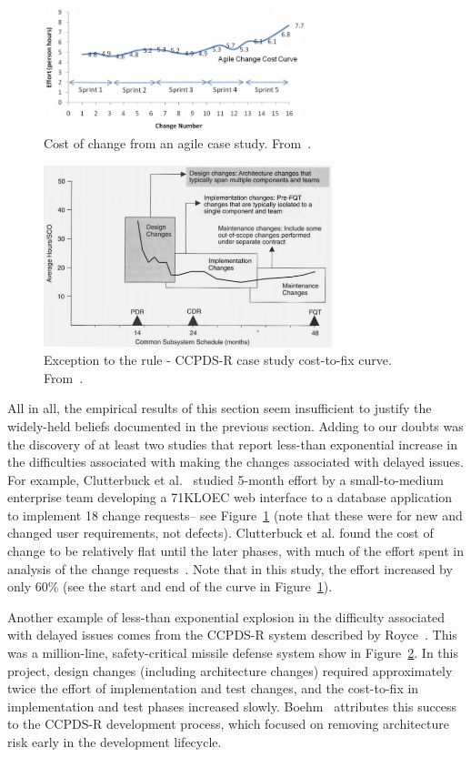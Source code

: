 \begin{figure}
 \includegraphics[width=3in]{img/clutterbuck.png} 
 \caption{Cost of change from an agile case study. From~\cite{Clutterbuck09}.}\label{fig:clutterbuck}
 \end{figure}

\begin{figure}
 \includegraphics[width=3.3in]{img/Royce98.png}
 \caption{Exception to the rule - CCPDS-R case study cost-to-fix curve. From~\cite{Royce98}.}\label{fig:royce}
 \end{figure}
 
 
 All in all, the empirical results of this section seem insufficient to justify
 the widely-held beliefs documented in the previous section. Adding to our doubts
 was the discovery of at least two studies that report less-than exponential
 increase in the difficulties associated with making the changes associated with delayed
 issues. For example,
Clutterbuck et al.~\cite{Clutterbuck09} studied 5-month effort by a small-to-medium enterprise team developing a 71KLOEC web interface to a database application to implement 18 change requests-- see Figure~\ref{fig:clutterbuck} (note that these were for new and changed user requirements, not defects). Clutterbuck et al. found the cost of change to be relatively flat until the later phases, with much of the effort spent in analysis of the change requests~\cite{Clutterbuck09}. Note that in this study, the effort increased by only 60\% (see the start and end of the curve in Figure~\ref{fig:clutterbuck}).

Another example of less-than exponential explosion in the difficulty associated with delayed issues comes from the  CCPDS-R
system described by Royce~\cite{Royce98}. This was a million-line, safety-critical missile defense system show in Figure~\ref{fig:royce}. In this project, design changes (including architecture changes) required approximately twice the effort of implementation and test changes, and the cost-to-fix in implementation and test phases increased slowly. Boehm~\cite{Boehm10} attributes this success to the CCPDS-R development process, which focused on removing architecture risk early in the development lifecycle.
 
